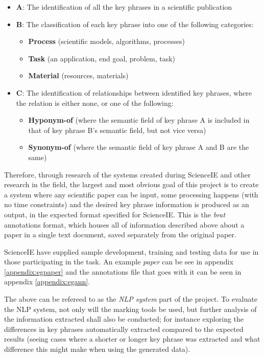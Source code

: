 \begin{itemize}
	\item \textbf{A}: The identification of all the key phrases in a scientific publication
	\item \textbf{B}: The classification of each key phrase into one of the following categories:
	\begin{itemize}
		\item \textbf{Process} (scientific models, algorithms, processes)
		\item \textbf{Task} (an application, end goal, problem, task)
		\item \textbf{Material} (resources, materials)
	\end{itemize}
	\item \textbf{C}: The identification of relationships between identified key phrases, where the relation is either none, or one of the following:
	\begin{itemize}
		\item \textbf{Hyponym-of} (where the semantic field of key phrase A is included in that of key phrase B's semantic field, but not vice versa)
		\item \textbf{Synonym-of} (where the semantic field of key phrase A and B are the same)
	\end{itemize}
\end{itemize}

Therefore, through research of the systems created during ScienceIE and other research in the field, the largest and most obvious goal of this project is to create a system where any scientific paper can be input, some processing happens (with no time constraints) and the desired key phrase information is produced as an output, in the expected format specified for ScienceIE. This is the \textit{brat} annotations format, which houses all of information described above about a paper in a single text document, saved separately from the original paper. 

ScienceIE have supplied sample development, training and testing data for use in those participating in the task. An example \textit{paper} can be see in appendix \ref{appendix:egpaper} and the annotations file that goes with it can be seen in appendix \ref{appendix:egann}.

The above can be refereed to as the \textit{NLP system} part of the project. To evaluate the NLP system, not only will the marking tools be used, but further analysis of the information extracted shall also be conducted; for instance exploring the differences in key phrases automatically extracted compared to the expected results (seeing cases where a shorter or longer key phrase was extracted and what difference this might make when using the generated data).

